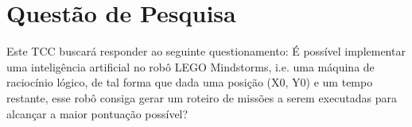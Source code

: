 \section*{Questão de Pesquisa}

Este TCC buscará responder ao seguinte questionamento: É possível implementar uma inteligência artificial no robô LEGO Mindstorms, i.e. uma máquina de raciocínio lógico, de tal forma que dada uma posição (X0, Y0) e um tempo restante, esse robô consiga gerar um roteiro de missões a serem executadas para alcançar a maior pontuação possível?